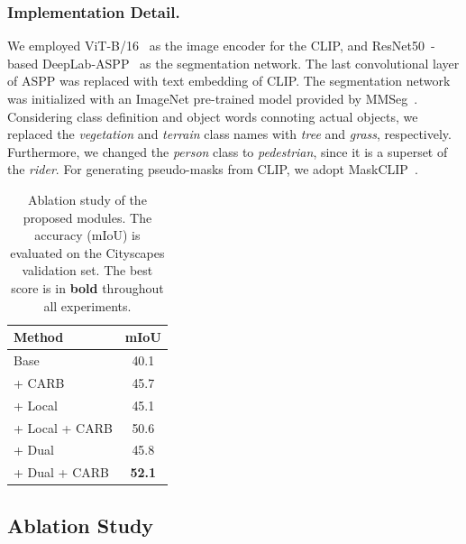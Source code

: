 \documentclass[letterpaper]{article} %
\begin{document}
\subsubsection{Implementation Detail.}
We employed ViT-B/16~\cite{dosovitskiyimage} as the image encoder for the CLIP, and ResNet50~\cite{he2016deep}-based DeepLab-ASPP~\cite{chen2017deeplab} as the segmentation network. The last convolutional layer of ASPP was replaced with text embedding of CLIP. The segmentation network was initialized with an ImageNet pre-trained model provided by MMSeg~\cite{mmseg2020}. Considering class definition and object words connoting actual objects, we replaced the \textit{vegetation} and \textit{terrain} class names with \textit{tree} and \textit{grass}, respectively. Furthermore, we changed the \textit{person} class to \textit{pedestrian}, since it is a superset of the \textit{rider}. For generating pseudo-masks from CLIP, we adopt MaskCLIP~\cite{zhou2022extract}.

\begin{table}[]
\normalsize
\centering
{\small
\begin{tabular}{@{}lc@{}}
\toprule
Method          & \multicolumn{1}{c}{mIoU}  \\ \midrule
Base                                & \multicolumn{1}{c}{40.1} \\
\multicolumn{1}{l}{+ CARB}           & \multicolumn{1}{c}{45.7} \\
\multicolumn{1}{l}{+ Local}          & \multicolumn{1}{c}{45.1} \\
\multicolumn{1}{l}{+ Local + CARB}   & \multicolumn{1}{c}{50.6} \\
\multicolumn{1}{l}{+ Dual}           & \multicolumn{1}{c}{45.8} \\
\multicolumn{1}{l}{+ Dual + CARB}    & \multicolumn{1}{c}{\textbf{52.1}} \\

\bottomrule
\end{tabular}
}
\caption{Ablation study of the proposed modules. The accuracy (mIoU) is evaluated on the Cityscapes validation set. The best score is in \textbf{bold} throughout all experiments.}
\label{tab:split}
\end{table}

\subsection{Ablation Study}
\label{sec:ablation}
\end{document}
